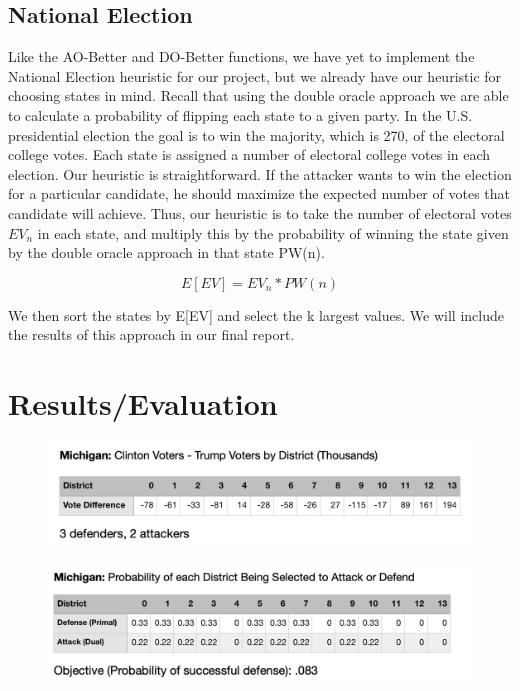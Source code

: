 \documentclass[letterpaper]{article} %
\begin{document}
\subsection{National Election}
Like the AO-Better and DO-Better functions, we have yet to implement the National Election heuristic for our project, but we already have our heuristic for choosing states in mind. Recall that using the double oracle approach we are able to calculate a probability of flipping each state to a given party. In the U.S. presidential election the goal is to win the majority, which is 270, of the electoral college votes. Each state is assigned a number of electoral college votes in each election. Our heuristic is straightforward. If the attacker wants to win the election for a particular candidate, he should maximize the expected number of votes that candidate will achieve. Thus, our heuristic is to take the number of electoral votes $EV_n$ in each state, and multiply this by the probability of winning the state given by the double oracle approach in that state PW(n). 

\begin{equation}
E[EV] = EV_n*PW(n)
\end{equation}

We then sort the states by E[EV] and select the k largest values. We will include the results of this approach in our final report.

\section{Results/Evaluation}

\begin{figure}
    \includegraphics[width=\linewidth]{michigan_votes}
    \label{michigan_votes}
\end{figure}

\begin{figure}
    \includegraphics[width=\linewidth]{michigan_probs}
    \label{michigan_probs}
\end{figure}
\end{document}
